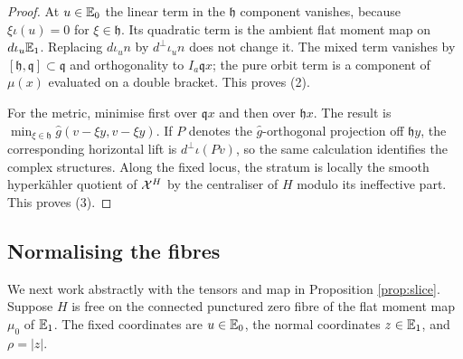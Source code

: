 \begin{proof}
At $u\in\mathbb E_0$ the linear term in the $\mathfrak h$ component
vanishes, because $\xi\iota(u)=0$ for $\xi\in\mathfrak h$.
Its quadratic term is the ambient flat moment map on
$d\iota_u\mathbb E_1$. Replacing $d\iota_u n$ by $d^\perp\iota_u n$
does not change it. The mixed term vanishes by
$[\mathfrak h,\mathfrak q]\subset\mathfrak q$ and orthogonality
to $I_a\mathfrak qx$; the pure orbit term is a component of
$\mu(x)$ evaluated on a double bracket. This proves (2).

For the metric, minimise first over $\mathfrak qx$ and then over
$\mathfrak hx$. The result is
$\min_{\xi\in\mathfrak h}\widehat g(v-\xi y,v-\xi y)$.
If $P$ denotes the $\widehat g$-orthogonal projection off
$\mathfrak hy$, the corresponding horizontal lift is
$d^\perp\iota(Pv)$, so
the same calculation identifies the complex structures. Along
the fixed locus, the stratum is locally the smooth hyperk\"ahler
quotient of $\mathcal X^H$ by the centraliser of $H$ modulo its ineffective
part. This proves (3).
\end{proof}

\subsection{Normalising the fibres}
We next work abstractly with the tensors and map in Proposition
\ref{prop:slice}. Suppose $H$ is free on the connected punctured
zero fibre of the flat moment map $\mu_0$ of $\mathbb E_1$.
The fixed coordinates are $u\in\mathbb E_0$, the normal coordinates
$z\in\mathbb E_1$, and $\rho=|z|$.

